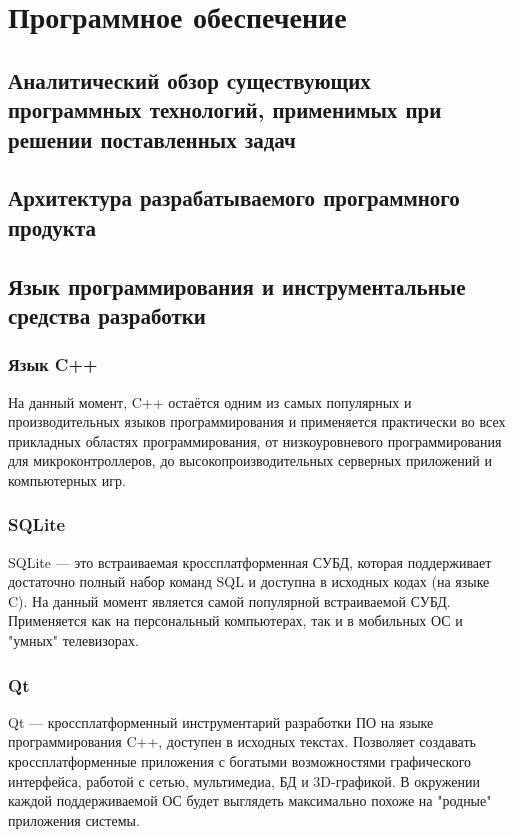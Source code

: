\newpage
\section{Программное обеспечение}

\subsection{Аналитический обзор существующих программных технологий, применимых при решении поставленных задач}
\subsection{Архитектура разрабатываемого программного продукта}
\subsection{Язык программирования и инструментальные средства разработки}

\subsubsection{Язык C++}
На данный момент, C++ остаётся одним из самых популярных и производительных языков программирования и применяется практически во всех прикладных областях
программирования, от низкоуровневого программирования для микроконтроллеров, до высокопроизводительных серверных приложений и компьютерных игр.

\subsubsection{SQLite}
SQLite — это встраиваемая кроссплатформенная СУБД, которая поддерживает достаточно полный набор команд SQL и доступна в исходных кодах (на языке C). На данный
момент является самой популярной встраиваемой СУБД. Применяется как на персональный компьютерах, так и в мобильных ОС и "умных" телевизорах.

\subsubsection{Qt}
Qt — кроссплатформенный инструментарий разработки ПО на языке программирования C++, доступен в исходных текстах. Позволяет создавать кроссплатформенные приложения с богатыми возможностями
графического интерфейса, работой с сетью, мультимедиа, БД и 3D-графикой. В окружении каждой поддерживаемой ОС будет выглядеть максимально похоже на "родные" приложения
системы.


